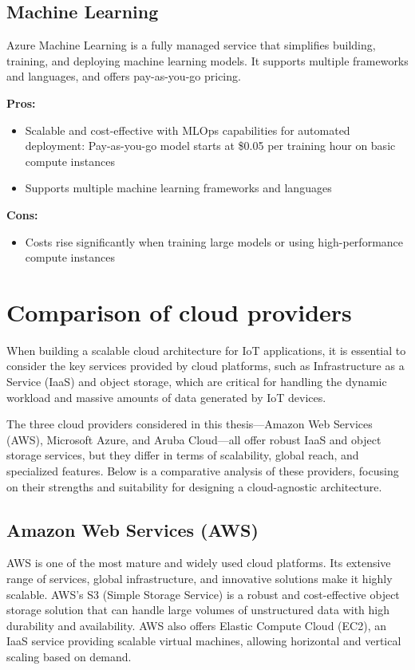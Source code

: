 \subsection*{Machine Learning}
\label{azure:machine-learning}
Azure Machine Learning is a fully managed service that simplifies building, training, and deploying machine learning models. It supports multiple frameworks and languages, and offers pay-as-you-go pricing.

\textbf{Pros:}
\begin{itemize}
    \item Scalable and cost-effective with MLOps capabilities for automated deployment: Pay-as-you-go model starts at \$0.05 per training hour on basic compute instances
    \item Supports multiple machine learning frameworks and languages
\end{itemize}

\textbf{Cons:}
\begin{itemize}
    \item Costs rise significantly when training large models or using high-performance compute instances
\end{itemize}

\section{Comparison of cloud providers}
\label{sec:comparison-cloud-providers}

When building a scalable cloud architecture for IoT applications, it is essential to consider the key services provided by cloud platforms, such as Infrastructure as a Service (IaaS) and object storage, which are critical for handling the dynamic workload and massive amounts of data generated by IoT devices.

The three cloud providers considered in this thesis—Amazon Web Services (AWS), Microsoft Azure, and Aruba Cloud—all offer robust IaaS and object storage services, but they differ in terms of scalability, global reach, and specialized features. Below is a comparative analysis of these providers, focusing on their strengths and suitability for designing a cloud-agnostic architecture.

\subsection*{Amazon Web Services (AWS)}
AWS is one of the most mature and widely used cloud platforms. Its extensive range of services, global infrastructure, and innovative solutions make it highly scalable. AWS's S3 (Simple Storage Service) is a robust and cost-effective object storage solution that can handle large volumes of unstructured data with high durability and availability. AWS also offers Elastic Compute Cloud (EC2), an IaaS service providing scalable virtual machines, allowing horizontal and vertical scaling based on demand. 

